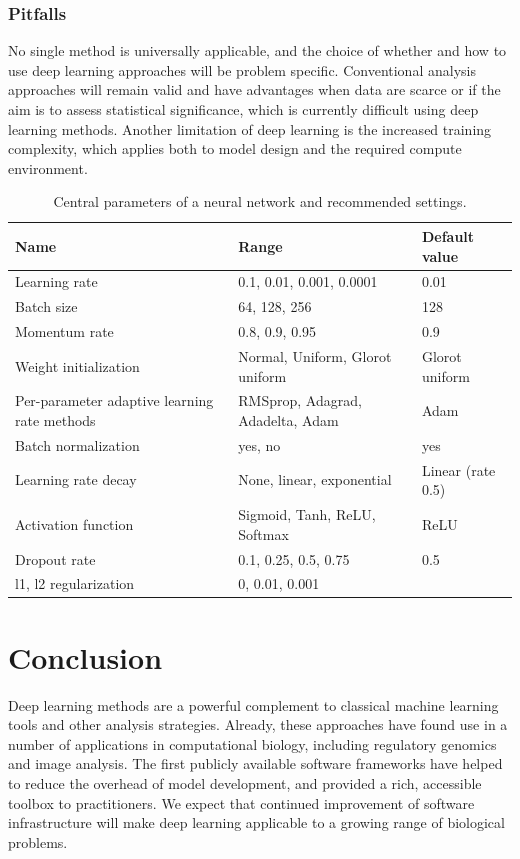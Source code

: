 \subsubsection{Pitfalls}
No single method is universally applicable, and the choice of whether and how to use deep learning approaches will be problem specific. Conventional analysis approaches will remain valid and have advantages when data are scarce or if the aim is to assess statistical significance, which is currently difficult using deep learning methods. Another limitation of deep learning is the increased training complexity, which applies both to model design and the required compute environment.

\begin{table}
\centering
\begin{tabular}{p{4cm}|p{5cm}|p{4cm}}
\textbf{Name} & \textbf{Range} & \textbf{Default value} \\
\toprule
Learning rate & 0.1, 0.01, 0.001, 0.0001 & 0.01 \\
Batch size & 64, 128, 256 & 128 \\
Momentum rate & 0.8, 0.9, 0.95 & 0.9 \\
Weight initialization & Normal, Uniform, Glorot uniform & Glorot uniform \\
Per-parameter adaptive learning rate methods & RMSprop, Adagrad, Adadelta, Adam & Adam \\
Batch normalization & yes, no & yes \\
Learning rate decay & None, linear, exponential & Linear (rate 0.5) \\
Activation function & Sigmoid, Tanh, ReLU, Softmax & ReLU \\
Dropout rate & 0.1, 0.25, 0.5, 0.75 & 0.5 \\
l1, l2 regularization & 0, 0.01, 0.001 & \\
\bottomrule
\end{tabular}
\caption{Central parameters of a neural network and recommended settings.}
\label{tab:dl_params}
\end{table}



\section{Conclusion}
Deep learning methods are a powerful complement to classical machine learning tools and other analysis strategies. Already, these approaches have found use in a number of applications in computational biology, including regulatory genomics and image analysis. The first publicly available software frameworks have helped to reduce the overhead of model development, and provided a rich, accessible toolbox to practitioners. We expect that continued improvement of software infrastructure will make deep learning applicable to a growing range of biological problems.
